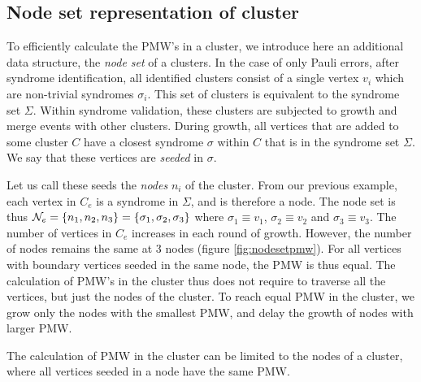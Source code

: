\subsection{Node set representation of cluster}\label{sec:nodeset}

To efficiently calculate the PMW's in a cluster, we introduce here an additional data structure, the \emph{node set} of a clusters. In the case of only Pauli errors, after syndrome identification, all identified clusters consist of a single vertex $v_i$ which are non-trivial syndromes $\sigma_i$. This set of clusters is equivalent to the syndrome set $\Sigma$. Within syndrome validation, these clusters are subjected to growth and merge events with other clusters. During growth, all vertices that are added to some cluster $C$ have a closest syndrome $\sigma$ within $C$ that is in the syndrome set $\Sigma$. We say that these vertices are \emph{seeded} in $\sigma$.

Let us call these seeds the \emph{nodes} $n_i$ of the cluster. From our previous example, each vertex in $C_e$ is a syndrome in $\Sigma$, and is therefore a node. The node set is thus $\mathcal{N}_e = \{n_1, n_2, n_3\} = \{\sigma_1, \sigma_2, \sigma_3\}$ where $\sigma_1 \equiv v_1$, $\sigma_2 \equiv v_2$ and $\sigma_3 \equiv v_3$. The number of vertices in $C_e$ increases in each round of growth. However, the number of nodes remains the same at 3 nodes (figure \ref{fig:nodesetpmw}). For all vertices with boundary vertices seeded in the same node, the PMW is thus equal. The calculation of PMW's in the cluster thus does not require to traverse all the vertices, but just the nodes of the cluster. To reach equal PMW in the cluster, we grow only the nodes with the smallest PMW, and delay the growth of nodes with larger PMW.

\begin{lemma}
  The calculation of PMW in the cluster can be limited to the nodes of a cluster, where all vertices seeded in a node have the same PMW.
\end{lemma}

